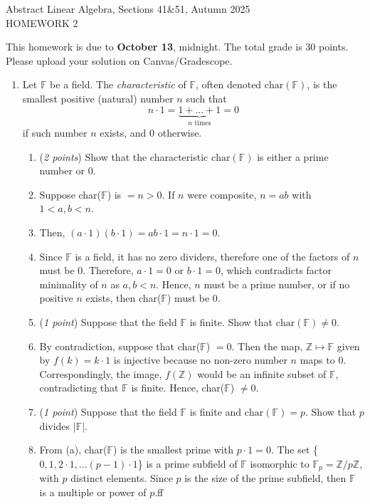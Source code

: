 \documentclass[11pt]{article}
\newcommand{\bbF}{\mathbb{F}}
\newcommand{\bbZ}{\mathbb{Z}}
\newcommand{\Char}{\mathrm{char}}
\newcommand{\head}[1]{
	\begin{center}
		{\large #1}
		\vspace{.2 in}
	\end{center}
	
	\bigskip 
}
\theoremstyle{definition}
\numberwithin{equation}{subsection}
\begin{document}
\pagestyle{plain}


\setcounter{section}{1}   

\head{Abstract Linear Algebra, Sections 41\&51, Autumn 2025\\ HOMEWORK 2} 

This homework is due to {\bf October 13}, midnight. The total grade is 30 points. Please upload your solution on Canvas/Gradescope.

\begin{enumerate}

\item Let $\bbF$ be a field. The \emph{characteristic} of $\bbF$, often denoted $\Char(\bbF)$, is the smallest positive (natural) number $n$ such that
$$n\cdot 1 = \underbrace{1+\ldots +1}_{\text{$n$ times}} =0 $$
if such number $n$ exists, and $0$ otherwise.
\begin{enumerate}
\item (\emph {2 points}) Show that the characteristic $\Char(\bbF)$ is either a prime number or $0$.
\item[] Suppose char($\bbF$) is $=n>0$. If $n$ were composite, $n=ab$ with $1<a,b<n$.
\item[] Then, $(a\cdot1)(b\cdot1)=ab\cdot 1=n\cdot 1=0$.
\item[] Since $\bbF$ is a field, it has no zero dividers, therefore one of the factors of $n$ must be 0. Therefore, $a\cdot1=0$ or $b\cdot1=0$, which contradicts factor minimality of $n$ as $a,b<n$. Hence, $n$ must be a prime number, or if no positive $n$ exists, then char($\bbF$) must be 0.
\item (\emph {1 point}) Suppose that the field $\bbF$ is finite. Show that $\Char(\bbF)\neq 0$.
\item[] By contradiction, suppose that char($\bbF$) $=0$. Then the map, $\bbZ \mapsto \bbF$ given by $f(k)=k\cdot1$ is injective because no non-zero number $n$ maps to 0. Correspondingly, the image, $f(\bbZ)$ would be an infinite subset of $\bbF$, contradicting that $\bbF$ is finite. Hence, char($\bbF$) $\neq 0$.
\item (\emph {1 point}) Suppose that the field $\bbF$ is finite and $\Char(\bbF)=p$. Show that $p$ divides $|\bbF|$.
\item[] From (a), char($\bbF$) is the smallest prime with $p\cdot1=0$. The set \{$0,1,2\cdot1,... (p-1)\cdot1$\} is a prime subfield of $\bbF$ isomorphic to $\bbF_p=\bbZ/p\bbZ$, with $p$ distinct elements. Since $p$ is the size of the prime subfield, then $\bbF$ is a multiple or power of $p$.ff

\end{enumerate}
\end{enumerate}
\end{document}
